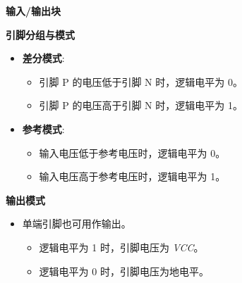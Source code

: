 \begin{frame}[allowframebreaks]{\textbf{输入/输出块}}
\begin{block}{\textbf{引脚分组与模式}}
\begin{itemize}
    \begin{itemize}
    \tightlist
    \item
    输入电压接近地电平时，逻辑电平为 0。
    \item
    输入电压接近 \emph{VCC} 时，逻辑电平为 1。
    \end{itemize}
\item
    \textbf{差分模式}:

    \begin{itemize}
    \tightlist
    \item
    引脚 P 的电压低于引脚 N 时，逻辑电平为 0。
    \item
    引脚 P 的电压高于引脚 N 时，逻辑电平为 1。
    \end{itemize}
\item
    \textbf{参考模式}:

    \begin{itemize}
    \tightlist
    \item
    输入电压低于参考电压时，逻辑电平为 0。
    \item
    输入电压高于参考电压时，逻辑电平为 1。
    \end{itemize}
\end{itemize}
\end{block}

\begin{block}{\textbf{输出模式}}
\label{ux8f93ux51faux6a21ux5f0f}
\begin{itemize}
\tightlist
\item
    单端引脚也可用作输出。

    \begin{itemize}
    \tightlist
    \item
    逻辑电平为 1 时，引脚电压为 \emph{VCC}。
    \item
    逻辑电平为 0 时，引脚电压为地电平。
    \end{itemize}
\end{itemize}
\end{block}
\end{frame}

